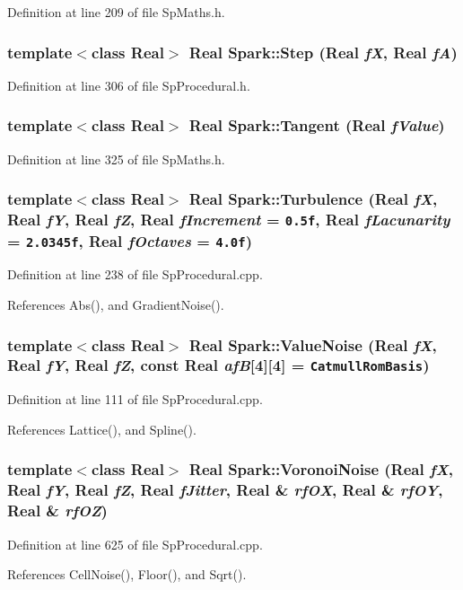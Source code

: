 Definition at line 209 of file Sp\-Maths.h.
\subsubsection{\setlength{\rightskip}{0pt plus 5cm}template$<$class Real$>$ Real Spark::Step (Real {\em f\-X}, Real {\em f\-A})}\label{namespaceSpark_a59}


Definition at line 306 of file Sp\-Procedural.h.
\subsubsection{\setlength{\rightskip}{0pt plus 5cm}template$<$class Real$>$ Real Spark::Tangent (Real {\em f\-Value})}\label{namespaceSpark_a67}


Definition at line 325 of file Sp\-Maths.h.
\subsubsection{\setlength{\rightskip}{0pt plus 5cm}template$<$class Real$>$ Real Spark::Turbulence (Real {\em f\-X}, Real {\em f\-Y}, Real {\em f\-Z}, Real {\em f\-Increment} = {\tt 0.5f}, Real {\em f\-Lacunarity} = {\tt 2.0345f}, Real {\em f\-Octaves} = {\tt 4.0f})}\label{namespaceSpark_a77}


Definition at line 238 of file Sp\-Procedural.cpp.

References Abs(), and Gradient\-Noise().
\subsubsection{\setlength{\rightskip}{0pt plus 5cm}template$<$class Real$>$ Real Spark::Value\-Noise (Real {\em f\-X}, Real {\em f\-Y}, Real {\em f\-Z}, const Real {\em af\-B}[4][4] = {\tt CatmullRomBasis})}\label{namespaceSpark_a75}


Definition at line 111 of file Sp\-Procedural.cpp.

References Lattice(), and Spline().
\subsubsection{\setlength{\rightskip}{0pt plus 5cm}template$<$class Real$>$ Real Spark::Voronoi\-Noise (Real {\em f\-X}, Real {\em f\-Y}, Real {\em f\-Z}, Real {\em f\-Jitter}, Real \& {\em rf\-OX}, Real \& {\em rf\-OY}, Real \& {\em rf\-OZ})}\label{namespaceSpark_a84}


Definition at line 625 of file Sp\-Procedural.cpp.

References Cell\-Noise(), Floor(), and Sqrt().